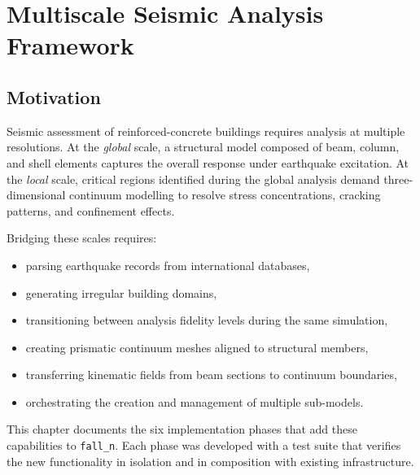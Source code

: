 \chapter{Multiscale Seismic Analysis Framework}
\label{ch:multiscale_seismic}

%

\section{Motivation}

Seismic assessment of reinforced-concrete buildings requires analysis at
multiple resolutions.  At the \emph{global} scale, a structural model
composed of beam, column, and shell elements captures the overall response
under earthquake excitation.  At the \emph{local} scale, critical regions
identified during the global analysis demand three-dimensional continuum
modelling to resolve stress concentrations, cracking patterns, and
confinement effects.

Bridging these scales requires:
\begin{itemize}
  \item parsing earthquake records from international databases,
  \item generating irregular building domains,
  \item transitioning between analysis fidelity levels during the same
        simulation,
  \item creating prismatic continuum meshes aligned to structural members,
  \item transferring kinematic fields from beam sections to continuum
        boundaries,
  \item orchestrating the creation and management of multiple sub-models.
\end{itemize}

This chapter documents the six implementation phases that add these
capabilities to \texttt{fall\_n}.  Each phase was developed with a
test suite that verifies the new functionality in isolation and in
composition with existing infrastructure.


